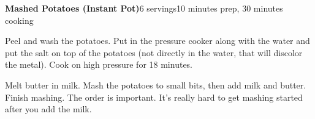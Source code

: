\documentclass[../Cookbook.tex]{subfiles}
\begin{document}
\begin{recipe}[MashedPotatoesInstantPot]{\textbf{Mashed Potatoes (Instant Pot)}}{6 servings}{10 minutes prep, 30 minutes cooking}

	Peel and wash the potatoes.
	Put in the pressure cooker along with the water and put the salt on top of the potatoes (not directly in the water, that will discolor the metal).
	Cook on high pressure for 18 minutes.

	Melt butter in milk. Mash the potatoes to small bits, then add milk and butter. Finish mashing.
	The order is important. It's really hard to get mashing started after you add the milk.

\end{recipe}
\end{document}
